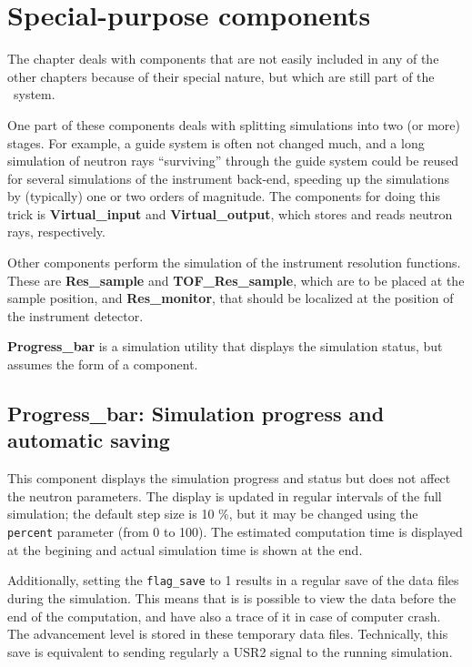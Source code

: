 \chapter{Special-purpose components}

The chapter deals with components that are not easily included
in any of the other chapters because of their special nature,
but which are still part of the \MCS\ system.

One part of these components deals with splitting simulations
into two (or more) stages. For example, a guide system is often
not changed much, and a long simulation of neutron rays
``surviving'' through the guide system could be reused
for several simulations of the instrument back-end, speeding up
the simulations by (typically) one or two orders of magnitude.
The components for doing this trick is {\bf Virtual\_input} and
{\bf Virtual\_output}, which stores and reads neutron rays, respectively.

Other components perform the simulation of the instrument
resolution functions. These are {\bf Res\_sample} and {\bf TOF\_Res\_sample}, 
which are to be
placed at the sample position, and {\bf Res\_monitor}, that should
be localized at the position of the instrument detector.

{\bf Progress\_bar} is a simulation utility that displays the simulation
status, but assumes the form of a component.

\newpage


\newpage


\newpage


\newpage


\newpage


\newpage
\section{Progress\_bar: Simulation progress and automatic saving}
\label{s:progress-bar}

This component displays the simulation progress and status
but does not affect the neutron parameters. 
The display is updated in regular intervals of the full simulation;
the default step size is 10 \%, but it may be changed using 
the \verb+percent+ parameter (from 0 to 100). 
The estimated computation time is displayed at the begining 
and actual simulation time is shown at the end.

Additionally, setting the \verb+flag_save+ to 1 results in 
a regular save of the data files during the simulation. 
This means that is is possible to view the data before the end 
of the computation, and have also a trace of it in case of 
computer crash. The advancement level is stored in these temporary 
data files. Technically, this save is equivalent to sending regularly 
a USR2 signal to the running simulation.
